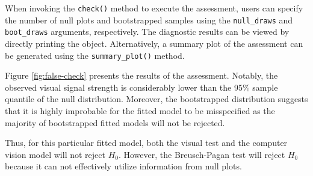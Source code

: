 \documentclass[]{interact}
\theoremstyle{plain}%
\theoremstyle{definition}
\theoremstyle{remark}
\newenvironment{Shaded}{\begin{snugshade}}{\end{snugshade}}
\newcommand{\AttributeTok}[1]{\textcolor[rgb]{0.13,0.29,0.53}{#1}}
\newcommand{\DataTypeTok}[1]{\textcolor[rgb]{0.13,0.29,0.53}{#1}}
\newcommand{\DecValTok}[1]{\textcolor[rgb]{0.00,0.00,0.81}{#1}}
\newcommand{\FunctionTok}[1]{\textcolor[rgb]{0.13,0.29,0.53}{\textbf{#1}}}
\newcommand{\NormalTok}[1]{#1}
\newcommand{\SpecialCharTok}[1]{\textcolor[rgb]{0.81,0.36,0.00}{\textbf{#1}}}
\begin{document}
When invoking the \texttt{check()} method to execute the assessment,
users can specify the number of null plots and bootstrapped samples
using the \texttt{null\_draws} and \texttt{boot\_draws} arguments,
respectively. The diagnostic results can be viewed by directly printing
the object. Alternatively, a summary plot of the assessment can be
generated using the \texttt{summary\_plot()} method.

\begin{Shaded}
\end{Shaded}

Figure \ref{fig:false-check} presents the results of the assessment.
Notably, the observed visual signal strength is considerably lower than
the 95\% sample quantile of the null distribution. Moreover, the
bootstrapped distribution suggests that it is highly improbable for the
fitted model to be misspecified as the majority of bootstrapped fitted
models will not be rejected.

Thus, for this particular fitted model, both the visual test and the
computer vision model will not reject \(H_0\). However, the
Breusch-Pagan test will reject \(H_0\) because it can not effectively
utilize information from null plots.
\end{document}
